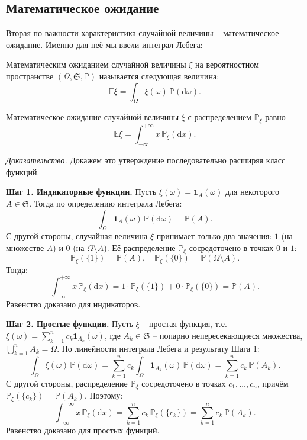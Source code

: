 \subsection{Математическое ожидание}

Вторая по важности характеристика случайной величины -- математическое ожидание. Именно для неё мы ввели интеграл Лебега:

\begin{definition}
Математическим ожиданием случайной величины $\xi$ на вероятностном пространстве $(\Omega, \mathfrak{S}, \mathbb{P})$ называется следующая величина:
\[
\mathbb{E}\xi = \int_{\Omega} \xi(\omega) \, \mathbb{P}(\mathrm{d}\omega).
\]
\end{definition}

\begin{theorem}
Математическое ожидание случайной величины $\xi$ с распределением $\mathbb{P}_{\xi}$ равно
\[
\mathbb{E}\xi = \int_{-\infty}^{+\infty} x \, \mathbb{P}_{\xi}(\mathrm{d}x).
\]
\end{theorem}

\textit{Доказательство.} Докажем это утверждение последовательно расширяя класс функций.

\textbf{Шаг 1. Индикаторные функции.} Пусть $\xi(\omega) = \mathbf{1}_A(\omega)$ для некоторого $A \in \mathfrak{S}$. Тогда по определению интеграла Лебега:
\[
\int_{\Omega} \mathbf{1}_A(\omega) \, \mathbb{P}(\mathrm{d}\omega) = \mathbb{P}(A).
\]
С другой стороны, случайная величина $\xi$ принимает только два значения: $1$ (на множестве $A$) и $0$ (на $\Omega \setminus A$). Её распределение $\mathbb{P}_{\xi}$ сосредоточено в точках $0$ и $1$:
\[
\mathbb{P}_{\xi}(\{1\}) = \mathbb{P}(A), \quad \mathbb{P}_{\xi}(\{0\}) = \mathbb{P}(\Omega \setminus A).
\]
Тогда:
\[
\int_{-\infty}^{+\infty} x \, \mathbb{P}_{\xi}(\mathrm{d}x) = 1 \cdot \mathbb{P}_{\xi}(\{1\}) + 0 \cdot \mathbb{P}_{\xi}(\{0\}) = \mathbb{P}(A).
\]
Равенство доказано для индикаторов.

\textbf{Шаг 2. Простые функции.} Пусть $\xi$ -- простая функция, т.е. $\xi(\omega) = \sum_{k=1}^{n} c_k \mathbf{1}_{A_k}(\omega)$, где $A_k \in \mathfrak{S}$ -- попарно непересекающиеся множества, $\bigcup_{k=1}^{n} A_k = \Omega$. По линейности интеграла Лебега и результату Шага 1:
\[
\int_{\Omega} \xi(\omega) \, \mathbb{P}(\mathrm{d}\omega) = \sum_{k=1}^{n} c_k \int_{\Omega} \mathbf{1}_{A_k}(\omega) \, \mathbb{P}(\mathrm{d}\omega) = \sum_{k=1}^{n} c_k \, \mathbb{P}(A_k).
\]
С другой стороны, распределение $\mathbb{P}_{\xi}$ сосредоточено в точках $c_1, \ldots, c_n$, причём $\mathbb{P}_{\xi}(\{c_k\}) = \mathbb{P}(A_k)$. Поэтому:
\[
\int_{-\infty}^{+\infty} x \, \mathbb{P}_{\xi}(\mathrm{d}x) = \sum_{k=1}^{n} c_k \, \mathbb{P}_{\xi}(\{c_k\}) = \sum_{k=1}^{n} c_k \, \mathbb{P}(A_k).
\]
Равенство доказано для простых функций.

